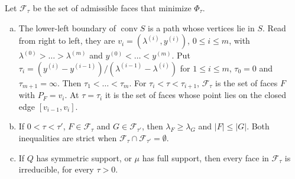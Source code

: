 \begin{theorem}\label{thm:hull}
Let $\mathcal F_\tau$ be the set of admissible faces that minimize
$\Phi_\tau$.
\begin{enumerate}[(a)]
\item The lower-left boundary of $\operatorname{conv}S$ is a path whose
vertices lie in $S$. Read from right to left, they are
$v_i=(\lambda^{(i)},y^{(i)})$, $0\le i\le m$, with
$\lambda^{(0)}>\dots>\lambda^{(m)}$ and $y^{(0)}<\dots<y^{(m)}$. Put
$\tau_i=(y^{(i)}-y^{(i-1)})/(\lambda^{(i-1)}-\lambda^{(i)})$ for $1\le i\le m$,
$\tau_0=0$ and $\tau_{m+1}=\infty$. Then $\tau_1<\dots<\tau_m$. For
$\tau_i<\tau<\tau_{i+1}$, $\mathcal F_\tau$ is the set of faces $F$ with
$P_F=v_i$. At $\tau=\tau_i$ it is the set of faces whose point lies on the
closed edge $[v_{i-1},v_i]$.
\item If $0<\tau<\tau'$, $F\in\mathcal F_\tau$ and $G\in\mathcal F_{\tau'}$,
then $\lambda_F\ge\lambda_G$ and $\lvert F\rvert\le\lvert G\rvert$. Both
inequalities are strict when $\mathcal F_\tau\cap\mathcal F_{\tau'}=\emptyset$.
\item If $Q$ has symmetric support, or $\mu$ has full support, then every face
in $\mathcal F_\tau$ is irreducible, for every $\tau>0$.
\end{enumerate}
\end{theorem}

